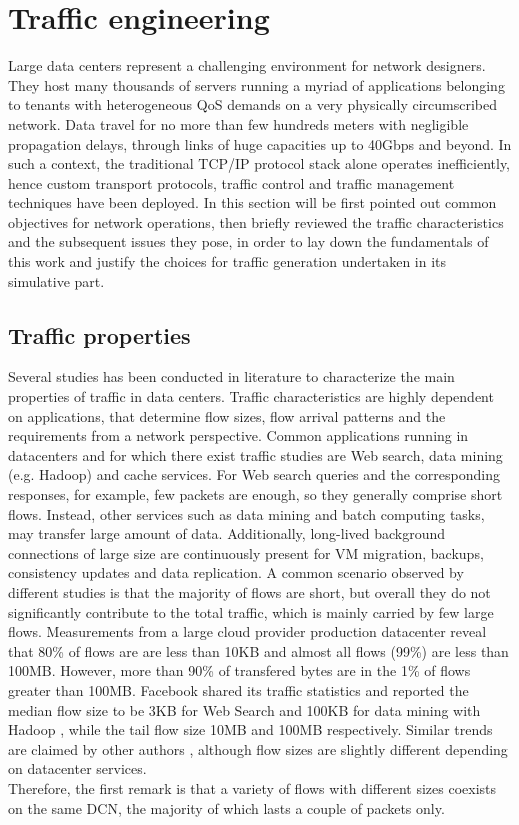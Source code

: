\section{Traffic engineering}

Large data centers represent a challenging environment for network designers. They host many thousands of servers running a myriad of applications belonging to tenants with heterogeneous QoS demands on a very physically circumscribed network. Data travel for no more than few hundreds meters with negligible propagation delays, through links of huge capacities up to 40Gbps and beyond. In such a context, the traditional TCP/IP protocol stack alone operates inefficiently, hence custom transport protocols, traffic control and traffic management techniques have been deployed. In this section will be first pointed out common objectives for network operations, then briefly reviewed the traffic characteristics and the subsequent issues they pose, in order to lay down the fundamentals of this work and justify the choices for traffic generation undertaken in its simulative part.

\subsection{Traffic properties}
\label{sec:traffic-properties}
Several studies has been conducted in literature to characterize the main properties of traffic in data centers. Traffic characteristics are highly dependent on applications, that determine flow sizes, flow arrival patterns and the requirements from a network perspective. Common applications running in datacenters and for which there exist traffic studies are Web search, data mining (e.g. Hadoop) and cache services. For Web search queries and the corresponding responses, for example, few packets are enough, so they generally comprise short flows. Instead, other services such as data mining and batch computing tasks, may transfer large amount of data. Additionally, long-lived background connections of large size are continuously present for VM migration, backups, consistency updates and data replication. A common scenario observed by different studies is that the majority of flows are short, but overall they do not significantly contribute to the total traffic, which is mainly carried by few large flows. Measurements from a large cloud provider production datacenter reveal that 80\% of flows are are less than 10KB and almost all flows (99\%) are less than 100MB. However, more than 90\% of transfered bytes are in the 1\% of flows greater than 100MB.  Facebook \cite{facebook_dcn} shared its traffic statistics and reported the median flow size to be 3KB for Web Search and 100KB for data mining with Hadoop \cite{hadoop}, while the tail flow size 10MB and 100MB respectively. Similar trends are claimed by other authors \cite{net-traffic-characteristics-benson, pFabric, dctcp}, although flow sizes are slightly different depending on datacenter services. \\ 
Therefore, the first remark is that a variety of flows with different sizes coexists on the same DCN, the majority of which lasts a couple of packets only. 

